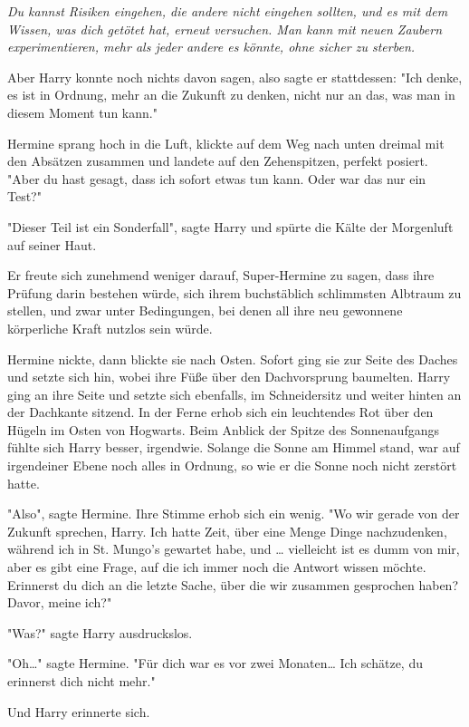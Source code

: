 {\emph{Du kannst Risiken eingehen, die andere nicht eingehen sollten, und es mit dem Wissen, was dich getötet hat, erneut versuchen. Man kann mit neuen Zaubern experimentieren, mehr als jeder andere es könnte, ohne sicher zu sterben.}

Aber Harry konnte noch nichts davon sagen, also sagte er stattdessen: "Ich denke, es ist in Ordnung, mehr an die Zukunft zu denken, nicht nur an das, was man in diesem Moment tun kann."

Hermine sprang hoch in die Luft, klickte auf dem Weg nach unten dreimal mit den Absätzen zusammen und landete auf den Zehenspitzen, perfekt posiert.\\ "Aber du hast gesagt, dass ich sofort etwas tun kann. Oder war das nur ein Test?"

"Dieser Teil ist ein Sonderfall", sagte Harry und spürte die Kälte der Morgenluft auf seiner Haut.

Er freute sich zunehmend weniger darauf, Super-Hermine zu sagen, dass ihre Prüfung darin bestehen würde, sich ihrem buchstäblich schlimmsten Albtraum zu stellen, und zwar unter Bedingungen, bei denen all ihre neu gewonnene körperliche Kraft nutzlos sein würde.

Hermine nickte, dann blickte sie nach Osten. Sofort ging sie zur Seite des Daches und setzte sich hin, wobei ihre Füße über den Dachvorsprung baumelten. Harry ging an ihre Seite und setzte sich ebenfalls, im Schneidersitz und weiter hinten an der Dachkante sitzend. In der Ferne erhob sich ein leuchtendes Rot über den Hügeln im Osten von Hogwarts. Beim Anblick der Spitze des Sonnenaufgangs fühlte sich Harry besser, irgendwie. Solange die Sonne am Himmel stand, war auf irgendeiner Ebene noch alles in Ordnung, so wie er die Sonne noch nicht zerstört hatte.

"Also", sagte Hermine. Ihre Stimme erhob sich ein wenig. "Wo wir gerade von der Zukunft sprechen, Harry. Ich hatte Zeit, über eine Menge Dinge nachzudenken, während ich in St. Mungo's gewartet habe, und … vielleicht ist es dumm von mir, aber es gibt eine Frage, auf die ich immer noch die Antwort wissen möchte.\\ Erinnerst du dich an die letzte Sache, über die wir zusammen gesprochen haben? Davor, meine ich?"

"Was?" sagte Harry ausdruckslos.

"Oh…" sagte Hermine. "Für dich war es vor zwei Monaten… Ich schätze, du erinnerst dich nicht mehr."

Und Harry erinnerte sich.

}

